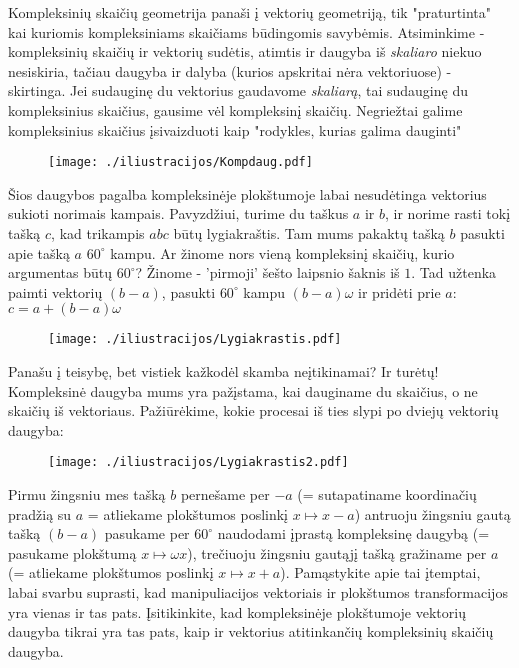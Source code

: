 Kompleksinių skaičių geometrija panaši į vektorių geometriją, tik "praturtinta" kai kuriomis kompleksiniams skaičiams būdingomis savybėmis. Atsiminkime - kompleksinių skaičių ir vektorių sudėtis, atimtis ir daugyba iš {\it skaliaro} niekuo nesiskiria, tačiau daugyba ir dalyba (kurios apskritai nėra vektoriuose) - skirtinga. Jei sudauginę du vektorius gaudavome {\it skaliarą}, tai sudauginę du kompleksinius skaičius, gausime vėl kompleksinį skaičių. Negriežtai galime kompleksinius skaičius įsivaizduoti kaip "rodykles, kurias galima dauginti"


\begin{figure}[h!]
  \begin{center}
    \texttt{[image: ./iliustracijos/Kompdaug.pdf]}
  \end{center}
\end{figure}


Šios daugybos pagalba kompleksinėje plokštumoje labai nesudėtinga vektorius sukioti norimais kampais. Pavyzdžiui, turime du taškus $a$ ir $b$, ir norime rasti tokį tašką $c$, kad trikampis $abc$ būtų lygiakraštis. Tam mums pakaktų tašką $b$ pasukti apie tašką $a$ $60^{\circ}$ kampu. Ar žinome nors vieną kompleksinį skaičių, kurio argumentas būtų $60^{\circ}$? Žinome - 'pirmoji' šešto laipsnio šaknis iš $1$. Tad užtenka paimti vektorių $(b-a)$, pasukti $60^{\circ}$ kampu $(b-a)\omega$ ir pridėti prie $a$: $c=a+(b-a)\omega$


\begin{figure}[h!]
  \begin{center}
    \texttt{[image: ./iliustracijos/Lygiakrastis.pdf]}
  \end{center}
\end{figure}

Panašu į teisybę, bet vistiek kažkodėl skamba neįtikinamai? Ir turėtų! Kompleksinė daugyba mums yra pažįstama, kai dauginame du skaičius, o ne skaičių iš vektoriaus. Pažiūrėkime, kokie procesai iš ties slypi po dviejų vektorių daugyba: 

\begin{figure}[h!]
  \begin{center}
    \texttt{[image: ./iliustracijos/Lygiakrastis2.pdf]}
  \end{center}
\end{figure}

Pirmu žingsniu mes tašką $b$ pernešame per $-a$ (= sutapatiname koordinačių pradžią su $a$ = atliekame plokštumos poslinkį $x \mapsto x-a$) antruoju žingsniu gautą tašką $(b-a)$ pasukame per $60^{\circ}$ naudodami įprastą kompleksinę daugybą (= pasukame plokštumą $x\mapsto \omega x$), trečiuoju žingsniu gautąjį tašką gražiname per $a$ (= atliekame plokštumos poslinkį $x \mapsto x+a$). Pamąstykite apie tai įtemptai, labai svarbu suprasti, kad manipuliacijos vektoriais ir plokštumos transformacijos yra vienas ir tas pats. Įsitikinkite, kad kompleksinėje plokštumoje vektorių  daugyba tikrai yra tas pats, kaip ir vektorius atitinkančių kompleksinių skaičių daugyba. 

